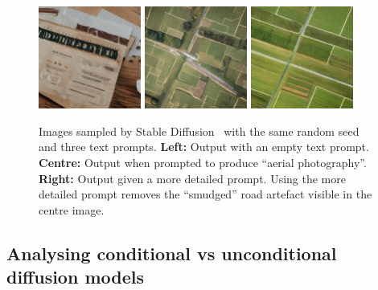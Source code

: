 \begin{figure}[t]
    \centering
    \includegraphics[width=0.3\textwidth]{figs/2sdm/sd_uncond.png}
    \hfill
    \includegraphics[width=0.3\textwidth]{figs/2sdm/uncond-aerial-photo.jpg}
    \hfill
    \includegraphics[width=0.3\textwidth]{figs/2sdm/cond-aerial-photo.jpg}
    \caption{Images sampled by Stable Diffusion~\citep{rombach2022high} with the same random seed and three text prompts. \textbf{Left:} Output with an empty text prompt. \textbf{Centre:} Output when prompted to produce ``aerial photography''. \textbf{Right:} Output given a more detailed prompt\protect\footnotemark. Using the more detailed prompt removes the ``smudged'' road artefact visible in the centre image.}
    \label{fig:stable-diffusion-example}
\end{figure}

\subsection{Analysing conditional vs unconditional diffusion models} \label{sec:2sdm-cond-vs-uncond-dgms}

